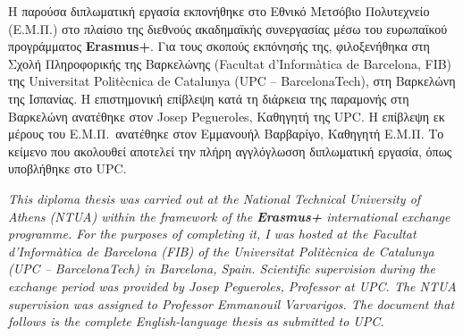 

Η παρούσα διπλωματική εργασία εκπονήθηκε στο Εθνικό Μετσόβιο Πολυτεχνείο (Ε.Μ.Π.)
στο πλαίσιο της διεθνούς ακαδημαϊκής συνεργασίας μέσω του ευρωπαϊκού προγράμματος
\textbf{Erasmus+}.
Για τους σκοπούς εκπόνησής της, φιλοξενήθηκα στη
Σχολή Πληροφορικής της Βαρκελώνης
(\foreignlanguage{english}{Facultat d'Informàtica de Barcelona, FIB})
της \foreignlanguage{english}{Universitat Politècnica de Catalunya}
(\foreignlanguage{english}{UPC -- BarcelonaTech}),
στη Βαρκελώνη της Ισπανίας.
Η επιστημονική επίβλεψη κατά τη διάρκεια της παραμονής στη Βαρκελώνη
ανατέθηκε στον \foreignlanguage{english}{Josep Pegueroles},
Καθηγητή της \foreignlanguage{english}{UPC}.
Η επίβλεψη εκ μέρους του Ε.Μ.Π.\ ανατέθηκε στον Εμμανουήλ Βαρβαρίγο,
Καθηγητή Ε.Μ.Π.
Το κείμενο που ακολουθεί αποτελεί την πλήρη αγγλόγλωσση διπλωματική εργασία,
όπως υποβλήθηκε στο \foreignlanguage{english}{UPC}.

\bigskip

{\itshape
This diploma thesis was carried out at the National Technical University of Athens (NTUA)
within the framework of the \textbf{Erasmus+} international exchange programme.
For the purposes of completing it, I was hosted at the
\foreignlanguage{english}{Facultat d'Informàtica de Barcelona (FIB)}
of the \foreignlanguage{english}{Universitat Politècnica de Catalunya (UPC -- BarcelonaTech)}
in Barcelona, Spain.
Scientific supervision during the exchange period was provided by
\foreignlanguage{english}{Josep Pegueroles}, Professor at \foreignlanguage{english}{UPC}.
The NTUA supervision was assigned to Professor Emmanouil Varvarigos.
The document that follows is the complete English-language thesis as submitted to \foreignlanguage{english}{UPC}.
}
